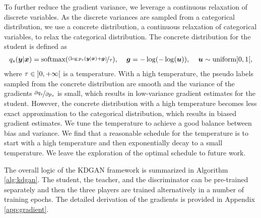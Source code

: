\documentclass{article}
\newcommand{\OVEC}[1]{\bm{#1}} %
\newcommand{\abbrpstd}{p_{s}}
\newcommand{\abbrqstd}{q_{s}}
\newcommand{\fullpstd}[1]{p_{s}(#1|\OVEC{x})}
\newcommand{\fullqstd}[1]{q_{s}(#1|\OVEC{x})}
\newcommand{\abbrptch}{p_{t}^{\varrho}}
\newcommand{\abbrqtch}{q_{t}^{\varrho}}
\begin{document}
To further reduce the gradient variance, we leverage a continuous relaxation of discrete variables.
As the discrete variances are sampled from a categorical distribution, we use a concrete distribution, a continuous relaxation of categorical variables, to relax the categorical distribution.
The concrete distribution for the student is defined as
\begin{equation} \label{equ:student concrete distribution}
\begin{aligned}
\fullqstd{\OVEC{y}}
=
\text{softmax}(\nicefrac{(\log\fullpstd{\OVEC{y}}+\OVEC{g})}{\tau})
\text{, } \quad
\OVEC{g}=-\log(-\log(\OVEC{u}))
\text{, } \quad
\OVEC{u}\sim\text{uniform}\interval[open left, open right]{0}{1}
\text{,}
\end{aligned}
\end{equation}%
where $\tau\in\interval[open left, open right]{0}{+\infty}$ is a temperature.
With a high temperature, the pseudo labels sampled from the concrete distribution are smooth and the variance of the gradients $\nicefrac{\partial\abbrqstd}{\partial\abbrpstd}$ is small, which results in low-variance gradient estimates for the student.
However, the concrete distribution with a high temperature becomes less exact approximation to the categorical distribution, which results in biased gradient estimates.
We tune the temperature to achieve a good balance between bias and variance.
We find that a reasonable schedule for the temperature is to start with a high temperature and then exponentially decay to a small temperature.
We leave the exploration of the optimal schedule to future work.

The overall logic of the KDGAN framework is summarized in Algorithm \ref{alg:kdgan}.
The student, the teacher, and the discriminator can be pre-trained separately and then the three players are trained alternatively in a number of training epochs.
The detailed derivation of the gradients is provided in Appendix \ref{app:gradient}.

\end{document}
